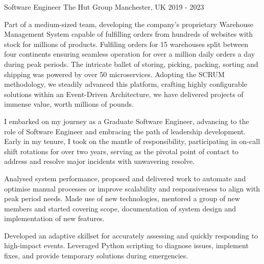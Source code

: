 \cventry
{Software Engineer} %
{The Hut Group} %
{Manchester, UK} %
{2019 - 2023} %
{\begin{cvitems}
     \item{Part of a medium-sized team, developing the company's proprietary Warehouse Management System
     capable of fulfilling orders from hundreds of websites with stock for millions of products. Fulfiling
     orders for 15 warehouses split between four continents ensuring seamless operation for over a million daily orders
     a day during peak periods. The intricate ballet of storing, picking, packing, sorting and shipping was powered by
     over 50 microservices. Adopting the SCRUM methodology, we steadily advanced this platform, crafting highly
     configurable solutions within an Event-Driven Architecture, we have delivered projects of immense value, worth
     millions of pounds.}
     \item{I embarked on my journey as a Graduate Software Engineer, advancing to the role of Software Engineer and
     embracing the path of leadership development. Early in my tenure, I took on the mantle of responsibility,
     participating in on-call shift rotations for over two years, serving as the pivotal point of contact to address and
     resolve major incidents with unwavering resolve.}
     \item{Analysed system performance, proposed and delivered work to automate and optimise manual
     processes or improve scalability and responsiveness to align with peak period needs. Made use of
     new technologies, mentored a group of new members and started covering scope, documentation of system
     design and implementation of new features.}
     \item{Developed an adaptive skillset for accurately assessing and quickly responding to high-impact events.
     Leveraged Python scripting to diagnose issues, implement fixes, and provide temporary solutions during emergencies.}
\end{cvitems}}